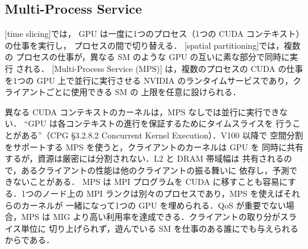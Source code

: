\documentclass[../main.tex]{subfiles}
\begin{document}
\subsection{Multi-Process Service}

\begin{definition}
  [time slicing]では，
  GPU は一度に1つのプロセス（1つの CUDA コンテキスト）の仕事を実行し，
  プロセスの間で切り替える．
  [spatial partitioning]では，複数の
  プロセスの仕事が，異なる SM のような GPU の互いに素な部分で同時に実行
  される．
  [Multi-Process Service (MPS)]
  は，複数のプロセスの CUDA の仕事を1つの GPU 上で並行に実行させる
  NVIDIA のランタイムサービスであり，クライアントごとに使用できる SM の
  上限を任意に設けられる．
\end{definition}

異なる CUDA コンテキストのカーネルは，MPS なしでは並行に実行できない．
\enquote{GPU は各コンテキストの進行を保証するためにタイムスライスを
行うことがある}（CPG §3.2.8.2 Concurrent Kernel Execution）．V100 以降で
空間分割をサポートする MPS を使うと，クライアントのカーネルは GPU を
同時に共有するが，資源は厳密には分割されない．L2 と DRAM 帯域幅は
共有されるので，あるクライアントの性能は他のクライアントの振る舞いに
依存し，予測できないことがある．
MPS は MPI プログラムを CUDA に移すことも容易にする．1つのノード上の
MPI ランクは別々のプロセスであり，MPS を使えばそれらのカーネルが
一緒になって1つの GPU を埋められる．QoS が重要でない場合，MPS は MIG
より高い利用率を達成できる．クライアントの取り分がスライス単位に
切り上げられず，遊んでいる SM を仕事のある誰にでも与えられるからである．%
\end{document}
